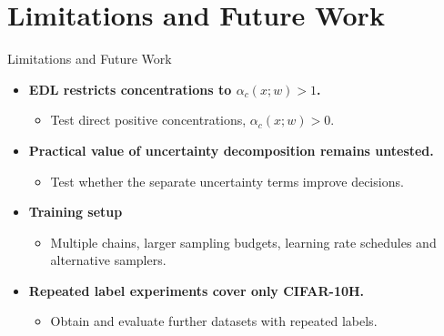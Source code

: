 \section{Limitations and Future Work}

\begin{frame}{Limitations and Future Work}
\label{frm:limitations}
\begin{itemize}
\setlength{\itemsep}{4mm}
\item \textbf{EDL restricts concentrations to $\alpha_c(x;w)>1$.}
\begin{itemize}
\item Test direct positive concentrations, $\alpha_c(x;w)>0$.
\end{itemize}
\item \textbf{Practical value of uncertainty decomposition remains untested.}
\begin{itemize}
\item Test whether the separate uncertainty terms improve decisions.
\end{itemize}
\item \textbf{Training setup}
\begin{itemize}
\item Multiple chains, larger sampling budgets, learning rate schedules and alternative samplers.
\end{itemize}
\item \textbf{Repeated label experiments cover only CIFAR-10H.}
\begin{itemize}
\item Obtain and evaluate further datasets with repeated labels.
\end{itemize}
\end{itemize}
\end{frame}
